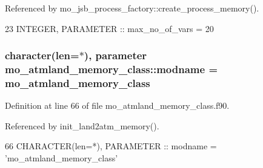 Referenced by mo\+\_\+jsb\+\_\+process\+\_\+factory\+::create\+\_\+process\+\_\+memory().


\begin{DoxyCode}
23   \textcolor{keywordtype}{INTEGER}, \textcolor{keywordtype}{PARAMETER} :: max\_no\_of\_vars = 20
\end{DoxyCode}
\hypertarget{namespacemo__atmland__memory__class_a61803b8c6f643016537157a3763a73c6}{}
\subsubsection[{modname}]{\setlength{\rightskip}{0pt plus 5cm}character(len=$\ast$), parameter mo\+\_\+atmland\+\_\+memory\+\_\+class\+::modname = \textquotesingle{}mo\+\_\+atmland\+\_\+memory\+\_\+class\textquotesingle{}}\label{namespacemo__atmland__memory__class_a61803b8c6f643016537157a3763a73c6}


Definition at line 66 of file mo\+\_\+atmland\+\_\+memory\+\_\+class.\+f90.



Referenced by init\+\_\+land2atm\+\_\+memory().


\begin{DoxyCode}
66   \textcolor{keywordtype}{CHARACTER(len=*)}, \textcolor{keywordtype}{PARAMETER} :: modname = \textcolor{stringliteral}{'mo\_atmland\_memory\_class'}
\end{DoxyCode}
